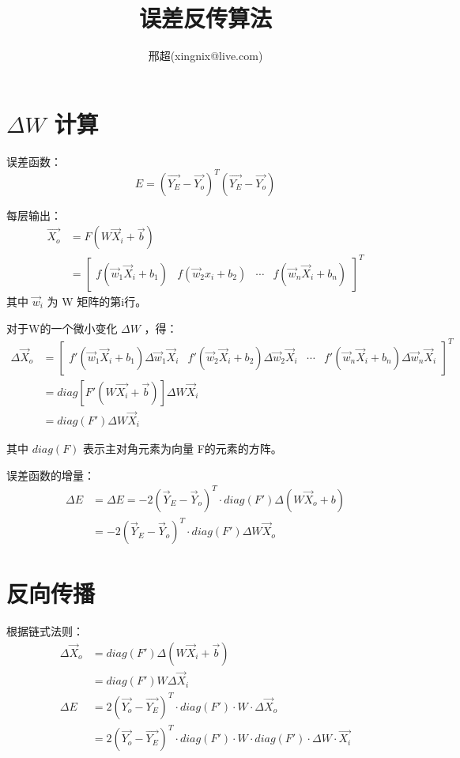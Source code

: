 \documentclass{article}
\begin{document}
\title{误差反传算法}
\author{邢超(xingnix@live.com)}
\maketitle


\section{ $\Delta W$ 计算}

误差函数： 
\[E=(\vec{Y_E}-\vec{Y_o})^T(\vec{Y_E}-\vec{Y_o})\]



每层输出：  
\begin{align*}
\vec{X_o} &=F(W\vec X_i+\vec b)\\
&=\begin{bmatrix}
f(\vec w_1 \vec X_i+b_1)  &  f(\vec w_2 x_i+b_2) & \cdots & f(\vec w_n \vec X_i +b_n)
\end{bmatrix}^T
\end{align*}
其中 $\vec w_i$ 为 W 矩阵的第i行。

对于W的一个微小变化 $\Delta W$ ，得：
\begin{align*}
\Delta \vec X_o &=\begin{bmatrix}
f'(\vec w_1 \vec X_i+b_1)\Delta \vec w_1 \vec X_i  &  f'(\vec w_2 \vec X_i+b_2)\Delta \vec w_2 \vec X_i & \cdots & f'(\vec w_n \vec X_i +b_n)\Delta \vec w_n \vec X_i
\end{bmatrix}^T \\
&=diag[F'(W\vec{X_i}+\vec{b})]\Delta W\vec X_i \\
&=diag(F')\Delta W \vec X_i
\end{align*}


其中 $diag(F)$ 表示主对角元素为向量 F的元素的方阵。

误差函数的增量：
\begin{align*}
\Delta E &=\Delta E =-2(\vec Y_E-\vec Y_o)^T\cdot diag(F')\Delta (W \vec X_o+b)\\
& =-2(\vec Y_E-\vec Y_o)^T\cdot diag(F')\Delta W \vec X_o
\end{align*}




\section{反向传播}
根据链式法则：
\begin{align*}
\Delta \vec X_o&=diag(F')\Delta (W \vec X_i+\vec b)\\
&=diag(F')W \Delta\vec X_i\\
\Delta E &= 2(\vec{Y_o}-\vec{Y_E})^T\cdot diag(F') \cdot W \cdot \Delta \vec X_o\\
&=2(\vec{Y_o}-\vec{Y_E})^T\cdot diag(F') \cdot W \cdot diag(F')\cdot \Delta W\cdot \vec{X_i}
\end{align*}
\end{document}
